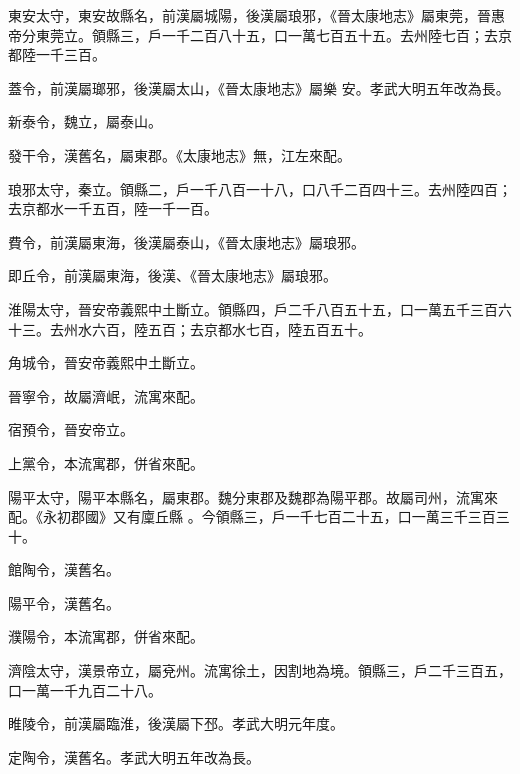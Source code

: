 \begin{pinyinscope}
 東安太守，東安故縣名，前漢屬城陽，後漢屬琅邪，《晉太康地志》屬東莞，晉惠帝分東莞立。領縣三，戶一千二百八十五，口一萬七百五十五。去州陸七百；去京都陸一千三百。



 蓋令，前漢屬瑯邪，後漢屬太山，《晉太康地志》屬樂
 安。孝武大明五年改為長。



 新泰令，魏立，屬泰山。



 發干令，漢舊名，屬東郡。《太康地志》無，江左來配。



 琅邪太守，秦立。領縣二，戶一千八百一十八，口八千二百四十三。去州陸四百；去京都水一千五百，陸一千一百。



 費令，前漢屬東海，後漢屬泰山，《晉太康地志》屬琅邪。



 即丘令，前漢屬東海，後漢、《晉太康地志》屬琅邪。



 淮陽太守，晉安帝義熙中土斷立。領縣四，戶二千八百五十五，口一萬五千三百六十三。去州水六百，陸五百；去京都水七百，陸五百五十。



 角城令，晉安帝義熙中土斷立。



 晉寧令，故屬濟岷，流寓來配。



 宿預令，晉安帝立。



 上黨令，本流寓郡，併省來配。


陽平太守，陽平本縣名，屬東郡。魏分東郡及魏郡為陽平郡。故屬司州，流寓來配。《永初郡國》又有廩丘縣
 。今領縣三，戶一千七百二十五，口一萬三千三百三十。



 館陶令，漢舊名。



 陽平令，漢舊名。



 濮陽令，本流寓郡，併省來配。



 濟陰太守，漢景帝立，屬兗州。流寓徐土，因割地為境。領縣三，戶二千三百五，口一萬一千九百二十八。



 睢陵令，前漢屬臨淮，後漢屬下邳。孝武大明元年度。



 定陶令，漢舊名。孝武大明五年改為長。




\end{pinyinscope}
